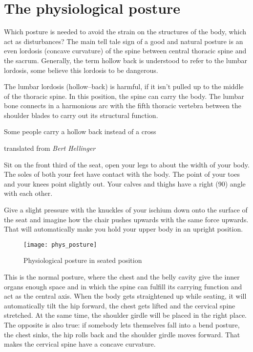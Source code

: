\documentclass[../main.tex]{subfiles}
\begin{document}
\section{The physiological posture}

Which posture is needed to avoid the strain on the structures of the body, which act as disturbances?
The main tell tale sign of a good and natural posture is an {even lordosis} (concave curvature) of the spine between central thoracic spine and the sacrum.
Generally, the term hollow back is understood to refer to the lumbar lordosis, some believe this lordosis to be dangerous.

The lumbar lordosis (hollow--back) is harmful, if it isn't {pulled up to the middle of the thoracic spine}.
In this position, the spine can carry the body.
The lumbar bone connects in a harmonious arc with the fifth thoracic vertebra between the shoulder blades to carry out its structural function.

\epigraph{Some people carry a hollow back instead of a cross}{translated from \textit{Bert Hellinger}}

Sit on the {front third of the seat}, {open your legs} to about the width of your body. \label{Posture:Sitting}
The soles of both your feet have {contact with the body}.
The point of your toes and your knees point slightly out. 
Your {calves and thighs} have a {right (90\degree) angle} with each other. 

Give a slight {pressure} with the knuckles of your ischium {down} onto the surface of the seat and imagine how the {chair pushes upwards} with the same force upwards.
That will automatically make you hold your upper body in an upright position.

        \begin{figure}[htb!]
          \centering
          \texttt{[image: phys\_posture]}
           \caption{Physiological posture in seated position~\cite{Haltung}}
        \end{figure}

This is the {normal posture}, where the chest and the belly cavity give the inner {organs enough space} and in which the {spine} can fulfill its carrying function and act as the {central axis}. 
When the body gets straightened up while seating, it will automatically {tilt the hip forward}, the {chest gets lifted} and the {cervical spine stretched}.
At the same time, the shoulder girdle will be placed in the right place.
The opposite is also true: if somebody lets themselves fall into a {bend posture}, the {chest sinks}, the {hip rolls back} and the {shoulder girdle moves forward}. That makes the {cervical spine} have a {concave curvature}.
\end{document}
